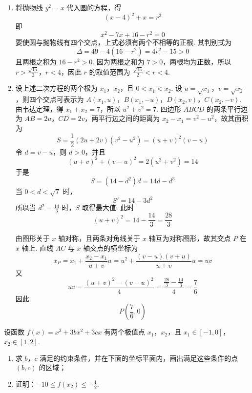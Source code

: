 \begin{solution}
\begin{enumerate}
\item 将抛物线 \(y^2=x\) 代入圆的方程，得
\[
\left(x-4\right)^2+x=r^2
\]
即
\[
x^2-7x+16-r^2=0
\]
要使圆与抛物线有四个交点，上式必须有两个不相等的正根. 其判别式为
\[
\Delta=49-4\left(16-r^2\right)=4r^2-15>0
\]
且两根之积为 \(16-r^2>0\). 因为两根之和为 \(7>0\)，两根均为正数，所以 \(r>\frac{\sqrt{15}}{2}\)，\(r<4\)，因此 \(r\) 的取值范围为 \(\frac{\sqrt{15}}{2}<r<4\).

\item 设上述二次方程的两个根为 \(x_1\)，\(x_2\)，且 \(0<x_1<x_2\). 设 \(u=\sqrt{x_1}\)，\(v=\sqrt{x_2}\)，则四个交点可表示为 \(A(x_1,u)\)，\(B(x_1,-u)\)，\(D(x_2,v)\)，\(C(x_2,-v)\).
由韦达定理，得 \(x_1+x_2=7\)，所以 \(u^2+v^2=7\). 四边形 \(ABCD\) 的两条平行边为 \(AB=2u\)，\(CD=2v\)，两平行边之间的距离为 \(x_2-x_1=v^2-u^2\)，故其面积为
\[
S=\frac{1}{2}\left(2u+2v\right)\left(v^2-u^2\right)=\left(u+v\right)^2(v-u)
\]
令 \(d=v-u\)，则 \(d>0\)，并且
\[
\left(u+v\right)^2+\left(v-u\right)^2=2\left(u^2+v^2\right)=14
\]
于是
\[
S=\left(14-d^2\right)d=14d-d^3
\]
当 \(0<d<\sqrt{7}\) 时，
\[
S'=14-3d^2
\]
所以当 \(d^2=\frac{14}{3}\) 时，\(S\) 取得最大值. 此时
\[
\left(u+v\right)^2=14-\frac{14}{3}=\frac{28}{3}
\]

由图形关于 \(x\) 轴对称，且两条对角线关于 \(x\) 轴互为对称图形，故其交点 \(P\) 在 \(x\) 轴上. 直线 \(AC\) 与 \(x\) 轴交点的横坐标为
\[
x_P=x_1+\frac{x_2-x_1}{u+v}u
=u^2+\frac{(v-u)(v+u)}{u+v}u
=uv
\]
又
\[
uv=\frac{(u+v)^2-(v-u)^2}{4}
=\frac{\frac{28}{3}-\frac{14}{3}}{4}=\frac{7}{6}
\]
因此
\[
P\left(\frac{7}{6},0\right)
\]
\end{enumerate}
\end{solution}

\begin{problem}
设函数 \( f(x) = x^3 + 3bx^2 + 3cx \) 有两个极值点 \(x_1\)，\(x_2\)，且 \( x_1 \in [-1, 0] \)，\( x_2 \in [1, 2] \).

\begin{enumerate}
\item 求 \(b\)，\(c\) 满足的约束条件，并在下面的坐标平面内，画出满足这些条件的点 \((b, c)\) 的区域；
\item 证明：\(-10 \leqslant f(x_{2}) \leqslant -\frac{1}{2}\).
\end{enumerate}

\end{problem}

